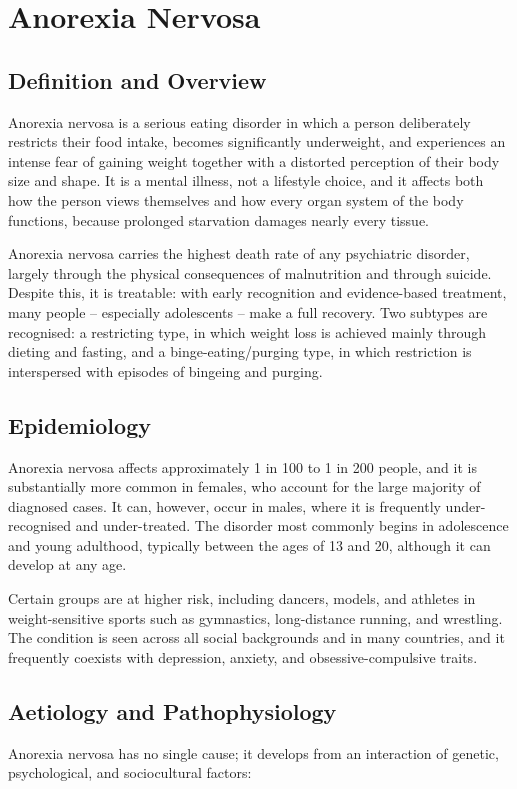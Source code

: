 \chapter{Anorexia Nervosa}

\section*{Definition and Overview}
Anorexia nervosa is a serious eating disorder in which a person deliberately restricts their food intake, becomes significantly underweight, and experiences an intense fear of gaining weight together with a distorted perception of their body size and shape. It is a mental illness, not a lifestyle choice, and it affects both how the person views themselves and how every organ system of the body functions, because prolonged starvation damages nearly every tissue.

Anorexia nervosa carries the highest death rate of any psychiatric disorder, largely through the physical consequences of malnutrition and through suicide. Despite this, it is treatable: with early recognition and evidence-based treatment, many people -- especially adolescents -- make a full recovery. Two subtypes are recognised: a restricting type, in which weight loss is achieved mainly through dieting and fasting, and a binge-eating/purging type, in which restriction is interspersed with episodes of bingeing and purging.

\section*{Epidemiology}
Anorexia nervosa affects approximately 1 in 100 to 1 in 200 people, and it is substantially more common in females, who account for the large majority of diagnosed cases. It can, however, occur in males, where it is frequently under-recognised and under-treated. The disorder most commonly begins in adolescence and young adulthood, typically between the ages of 13 and 20, although it can develop at any age.

Certain groups are at higher risk, including dancers, models, and athletes in weight-sensitive sports such as gymnastics, long-distance running, and wrestling. The condition is seen across all social backgrounds and in many countries, and it frequently coexists with depression, anxiety, and obsessive-compulsive traits.

\section*{Aetiology and Pathophysiology}
Anorexia nervosa has no single cause; it develops from an interaction of genetic, psychological, and sociocultural factors:

